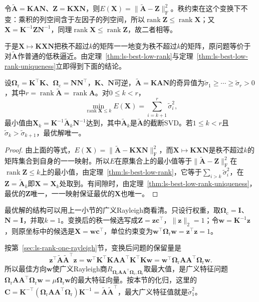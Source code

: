 令$\widetilde{\bm A}=\bm K\bm A\bm N$、$\bm Z=\bm K\bm X\bm N$，则$E(\bm X)=\lVert\widetilde{\bm A}-\bm Z\rVert_{\mathrm F}^2$。秩约束在这个变换下不变：乘积的列空间含于左因子的列空间，所以$\operatorname{rank}\bm Z\leq\operatorname{rank}\bm X$；又$\bm X=\bm K^{-1}\bm Z\bm N^{-1}$，同理$\operatorname{rank}\bm X\leq\operatorname{rank}\bm Z$，故二者相等。

于是$\bm X\mapsto\bm K\bm X\bm N$把秩不超过$k$的矩阵一一地变为秩不超过$k$的矩阵，原问题等价于对$\widetilde{\bm A}$作普通的低秩逼近。由定理~\ref{thm:ls-best-low-rank}与定理~\ref{thm:ls-best-low-rank-uniqueness}立即得到下面的结论。

\begin{theorem}[可分离权重下的最佳低秩逼近]
\label{thm:matrix-approximation-weighted-low-rank}
设$\bm\Omega_{\mathrm r}=\bm K^\top\bm K$、$\bm\Omega_{\mathrm c}=\bm N\bm N^\top$，$\bm K$、$\bm N$可逆，$\widetilde{\bm A}=\bm K\bm A\bm N$的奇异值为$\tilde\sigma_1\geq\cdots\geq\tilde\sigma_r>0$，其中$r=\operatorname{rank}\widetilde{\bm A}=\operatorname{rank}\bm A$。对$0\leq k<r$，
\[
 \min_{\operatorname{rank}\bm X\leq k}E(\bm X)=\sum_{i=k+1}^r\tilde\sigma_i^2 ,
\]
最小值由$\bm X_k=\bm K^{-1}\widetilde{\bm A}_k\bm N^{-1}$达到，其中$\widetilde{\bm A}_k$是$\widetilde{\bm A}$的截断SVD。若$1\leq k<r$且$\tilde\sigma_k>\tilde\sigma_{k+1}$，最优解唯一。
\end{theorem}
\begin{proof}
由上面的等式，$E(\bm X)=\lVert\widetilde{\bm A}-\bm K\bm X\bm N\rVert_{\mathrm F}^2$，而$\bm X\mapsto\bm K\bm X\bm N$是秩不超过$k$的矩阵集合到自身的一一映射。所以$E$在原集合上的最小值等于$\lVert\widetilde{\bm A}-\bm Z\rVert_{\mathrm F}^2$在$\operatorname{rank}\bm Z\leq k$上的最小值，由定理~\ref{thm:ls-best-low-rank}，它等于$\sum_{i>k}\tilde\sigma_i^2$，在$\bm Z=\widetilde{\bm A}_k$即$\bm X=\bm X_k$处取到。有间隙时，由定理~\ref{thm:ls-best-low-rank-uniqueness}，最优的$\bm Z$唯一，一一映射保证最优的$\bm X$也唯一。
\end{proof}

最优解的结构可以用上一小节的广义Rayleigh商看清。只设行权重，取$\bm\Omega_{\mathrm c}=\bm I$、$\bm N=\bm I$，并取$k=1$。变换后的秩一候选写成$\bm Z=\bm z\bm c^\top$，$\lVert\bm z\rVert_2=1$；令$\bm w=\bm K^{-1}\bm z$，则原坐标中的候选是$\bm X=\bm w\bm c^\top$，单位约束变为$\bm w^\top\bm\Omega_{\mathrm r}\bm w=\bm z^\top\bm z=1$。

按第~\ref{sec:ls-rank-one-rayleigh}节，变换后问题的保留量是
\[
 \bm z^\top\widetilde{\bm A}\widetilde{\bm A}^\top\bm z
 =\bm w^\top\bm K^\top\bm K\bm A\bm A^\top\bm K^\top\bm K\bm w
 =\bm w^\top\bm\Omega_{\mathrm r}\bm A\bm A^\top\bm\Omega_{\mathrm r}\bm w .
\]
所以最佳方向$\bm w$使广义Rayleigh商$R_{\bm\Omega_{\mathrm r}\bm A\bm A^\top\bm\Omega_{\mathrm r},\bm\Omega_{\mathrm r}}$取最大值，是广义特征问题$\bm\Omega_{\mathrm r}\bm A\bm A^\top\bm\Omega_{\mathrm r}\bm w=\mu\bm\Omega_{\mathrm r}\bm w$的最大特征向量。按本节的化归，这里的$\bm C=\bm K^{-\top}(\bm\Omega_{\mathrm r}\bm A\bm A^\top\bm\Omega_{\mathrm r})\bm K^{-1}=\widetilde{\bm A}\widetilde{\bm A}^\top$，最大广义特征值就是$\tilde\sigma_1^2$。

